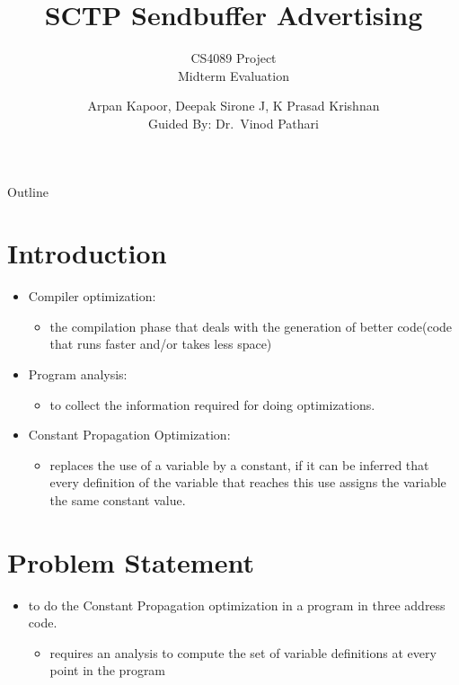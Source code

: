 \documentclass{beamer}
\title{SCTP Sendbuffer Advertising}
\subtitle{CS4089 Project\\
	Midterm Evaluation}
\author{Arpan Kapoor, Deepak Sirone J, K Prasad Krishnan\\
	Guided By: Dr.~Vinod Pathari}
\begin{document}
\begin{frame}
	\titlepage
\end{frame}

\begin{frame}{Outline}
	\tableofcontents
\end{frame}

\section{Introduction}
\begin{frame}{\insertsection}
\begin{itemize}
	\item Compiler optimization:
	\begin{itemize}
		\item the compilation phase that deals with the generation of
			better code(code that runs faster and/or takes less
			space)
	\end{itemize}
\end{itemize}

\begin{itemize}
	\item Program analysis:
	\begin{itemize}
		\item to collect the information required for doing
			optimizations.
	\end{itemize}
\end{itemize}

\begin{itemize}
	\item Constant Propagation Optimization: 
	\begin{itemize}
		\item replaces the use of a variable by a constant, if it can
			be inferred that every definition of the variable that
			reaches this use assigns the variable the same constant
			value.
	\end{itemize}
\end{itemize}
\end{frame}

\section{Problem Statement}
\begin{frame}{\insertsection}
\begin{itemize}
	\item to do the Constant Propagation optimization in a program in three
		address code.
	\begin{itemize}
		\item requires an analysis to compute the set of variable
			definitions at every point in the program
	\end{itemize}
\end{itemize}
\end{frame}
\end{document}
